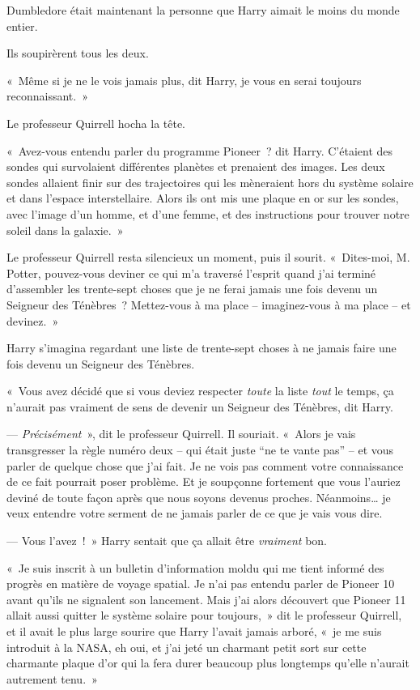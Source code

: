 Dumbledore était maintenant la personne que Harry aimait le moins du monde entier.

Ils soupirèrent tous les deux.

«~Même si je ne le vois jamais plus, dit Harry, je vous en serai toujours reconnaissant.~»

Le professeur Quirrell hocha la tête.

«~Avez-vous entendu parler du programme Pioneer~? dit Harry. C'étaient des sondes qui survolaient différentes planètes et prenaient des images. Les deux sondes allaient finir sur des trajectoires qui les mèneraient hors du système solaire et dans l'espace interstellaire. Alors ils ont mis une plaque en or sur les sondes, avec l'image d'un homme, et d'une femme, et des instructions pour trouver notre soleil dans la galaxie.~»

Le professeur Quirrell resta silencieux un moment, puis il sourit. «~Dites-moi, M. Potter, pouvez-vous deviner ce qui m'a traversé l'esprit quand j'ai terminé d'assembler les trente-sept choses que je ne ferai jamais une fois devenu un Seigneur des Ténèbres~? Mettez-vous à ma place -- imaginez-vous à ma place -- et devinez.~»

Harry s'imagina regardant une liste de trente-sept choses à ne jamais faire une fois devenu un Seigneur des Ténèbres.

«~Vous avez décidé que si vous deviez respecter \emph{toute} la liste \emph{tout} le temps, ça n'aurait pas vraiment de sens de devenir un Seigneur des Ténèbres, dit Harry.

--- \emph{Précisément}~», dit le professeur Quirrell. Il souriait. «~Alors je vais transgresser la règle numéro deux -- qui était juste “ne te vante pas” -- et vous parler de quelque chose que j'ai fait. Je ne vois pas comment votre connaissance de ce fait pourrait poser problème. Et je soupçonne fortement que vous l'auriez deviné de toute façon après que nous soyons devenus proches. Néanmoins… je veux entendre votre serment de ne jamais parler de ce que je vais vous dire.

--- Vous l'avez~!~» Harry sentait que ça allait être \emph{vraiment} bon.

«~Je suis inscrit à un bulletin d'information moldu qui me tient informé des progrès en matière de voyage spatial. Je n'ai pas entendu parler de Pioneer 10 avant qu'ils ne signalent son lancement. Mais j'ai alors découvert que Pioneer 11 allait aussi quitter le système solaire pour toujours,~» dit le professeur Quirrell, et il avait le plus large sourire que Harry l'avait jamais arboré, «~je me suis introduit à la NASA, eh oui, et j'ai jeté un charmant petit sort sur cette charmante plaque d'or qui la fera durer beaucoup plus longtemps qu'elle n'aurait autrement tenu.~»

